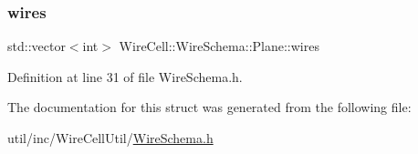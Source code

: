 \mbox{\label{struct_wire_cell_1_1_wire_schema_1_1_plane_a3364c87f0c03bf1475e10328ed977585}} 
\subsubsection{\texorpdfstring{wires}{wires}}
{\footnotesize\ttfamily std\+::vector$<$int$>$ Wire\+Cell\+::\+Wire\+Schema\+::\+Plane\+::wires}



Definition at line 31 of file Wire\+Schema.\+h.



The documentation for this struct was generated from the following file\+:\begin{DoxyCompactItemize}
\item 
util/inc/\+Wire\+Cell\+Util/\hyperlink{_wire_schema_8h}{Wire\+Schema.\+h}\end{DoxyCompactItemize}
